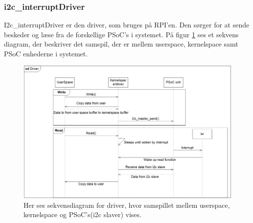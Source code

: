 \documentclass[Rapport/Rapport_main.tex]{subfiles}
\begin{document}
\subsubsection{i2c\_interruptDriver}
I2c\_interruptDriver er den driver, som bruges på RPI'en. Den sørger for at sende beskeder og læse fra de forskellige PSoC's i systemet. På figur \ref{fig:driver_sekvensdiagram} ses et sekvens diagram, der beskriver det samspil, der er mellem userspace, kernelspace samt PSoC enhederne i systemet. 
\begin{figure}[H]
    \centering
    \includegraphics[width=\textwidth]{Rapport/Arkitektur/graphics/driver_sekvensdiagram.png}
    \caption{Her ses sekvensdiagram for driver, hvor samspillet mellem userspace, kernelspace og PSoC's(i2c slaver) vises.}
    \label{fig:driver_sekvensdiagram}
\end{figure}
\end{document}
